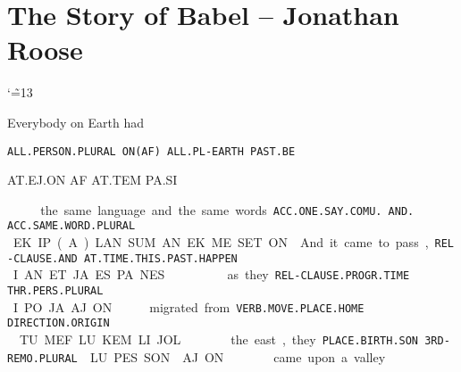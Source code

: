 \setlength{\parindent}{0pt}
\section{The Story of Babel -- {\small Jonathan Roose}}
{
\catcode`\~=13\def\~{\hspace{0.2cm}}
\baselineskip

Everybody		on 	Earth 		had

{\tt ALL.PERSON.PLURAL   	ON(AF)	ALL.PL-EARTH	PAST.BE	 }

AT.EJ.ON		AF	AT.TEM		PA.SI	 

\at\ej\on	~	\af~	\at\tem		~\pa\si	 

\vspace{0.2cm}

the same language	 and 	the same words. 

{\tt ACC.ONE.SAY.COMU.	AND.	ACC.SAME.WORD.PLURAL }

EK.IP.(A).LAN.SUM	AN	EK.ME.SET.ON

\vspace{0.5cm}

And	 		it came to pass, 			  

{\tt REL-CLAUSE.AND            AT.TIME.THIS.PAST.HAPPEN 		}

I.AN			ET.JA.ES.PA.NES				 

\Atlani\an                    \et\ja\es\pa\nes

\def\drie{\vspace{0.45cm}}
\drie

as	they	    

{\tt REL-CLAUSE.PROGR.TIME	THR.PERS.PLURAL }

I.PO.JA	.AJ.ON 

\Atlani\po\ja	\aj\on 


migrated          			from      		 

{\tt VERB.MOVE.PLACE.HOME	DIRECTION.ORIGIN	 }

\def\spak{\hspace{0.2cm}}
TU.MEF.LU.KEM LI.JOL 

\tu\mef\lu\kem\spak \li\jol

 

the east, 		they 		 

{\tt PLACE.BIRTH.SON	3RD-REMO.PLURAL }

LU.PES.SON \spak		AJ.ON 

\lu\pes\son \spak \aj\on

\drie 

came upon 		a valley                 

}
